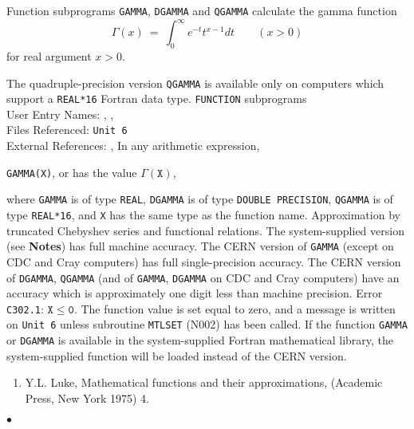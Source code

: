                         
    
\Submitter{}                           
                     
Function subprograms {\tt GAMMA}, {\tt DGAMMA}  and {\tt QGAMMA}
calculate the gamma function
$$ \Gamma(x) \ = \ \displaystyle \int_0 ^{\infty} e^{-t} t^{x-1}dt
\qquad (x > 0) $$
for real argument $x > 0$.
\par
The quadruple-precision version {\tt QGAMMA} is available only on
computers which support a {\tt REAL*16} Fortran data type.
\Structure
{\tt FUNCTION} subprograms\\
User Entry Names: , ,  \\
Files Referenced: {\tt Unit 6} \\
External References: , 
\Usage
In any arithmetic expression,
\begin{center}
{\tt GAMMA(X)},  \quad or 
\quad has the value \quad $\Gamma(\mathtt{X})$,
\end{center}
where {\tt GAMMA} is of type {\tt REAL}, {\tt DGAMMA} is of type
{\tt DOUBLE PRECISION}, {\tt QGAMMA} is of type {\tt REAL*16},
and  {\tt X} has the same type as the function name.
\Method
Approximation by truncated Chebyshev series and functional relations.
\Accuracy
The system-supplied version (see {\bf Notes}) has full machine
accuracy. The CERN version of {\tt GAMMA} (except on CDC
and Cray computers) has full single-precision accuracy. The
CERN version of {\tt DGAMMA}, {\tt QGAMMA}
(and of {\tt GAMMA}, {\tt DGAMMA} on CDC and
Cray computers) have an accuracy which is approximately
one digit less than machine precision.
 \Errorh
Error {\tt C302.1}: $\mathtt{X \le 0}$.
The function value is set equal to zero, and a message is written on
{\tt Unit 6} unless subroutine {\tt MTLSET} (N002) has been called.
\Notes
If the function {\tt GAMMA} or {\tt DGAMMA} is available in the
system-supplied Fortran mathematical library,
the system-supplied function will be loaded instead of the CERN version.
\Refer
\begin{enumerate}
\item Y.L. Luke, Mathematical functions and their approximations,
(Academic Press, New York 1975) 4.
\end{enumerate}
$\bullet$
